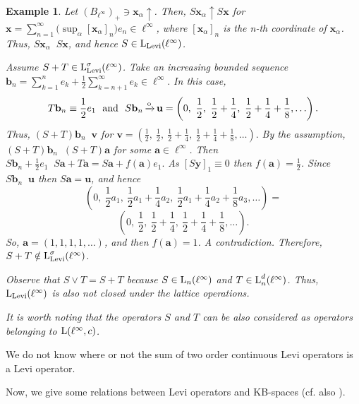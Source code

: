 \documentclass[10pt]{article}
\makeatletter
\newtheorem{example}[theorem]{Example}
\DeclareMathOperator{\convo}{\xrightarrow[]{o}}
\renewcommand{\subsection}{\@startsection{subsection}{1}
{0pt}{3.25ex plus 1ex minus.2ex}{-1em}{\normalfont\normalsize\bf}}
\makeatother
\begin{document}
{{{\begin{example}
{Let $(B_{\ell^\infty})_+\ni\mathbf{x}_\alpha\uparrow$.
Then, $S\mathbf{x}_\alpha\uparrow S\mathbf{x}$ for
$\mathbf{x}=\sum_{n=1}^\infty\Big(\sup_\alpha[\mathbf{x}_\alpha]_n\Big)e_n\in\ell^\infty$, 
where $[\mathbf{x}_\alpha]_n$ is the n-th coordinate of $\mathbf{x}_\alpha$.
Thus, $S\mathbf{x}_\alpha\convo S\mathbf{x}$, and hence
$S\in\text{\rm L}_{\text{\rm Levi}}(\ell^\infty)$.

Assume $S+T\in\text{\rm L}^\sigma_{\text{\rm Levi}}(\ell^\infty)$.
Take an increasing bounded sequence 
$
   \mathbf{b}_n=\sum_{k=1}^n e_k+\frac{1}{2}\sum_{k=n+1}^\infty e_k\in\ell^\infty.
$
In this case, 
$$
   T\mathbf{b}_n\equiv\frac{1}{2}e_1 \ \ \text{\rm and} \ \ 
   S\mathbf{b}_n\convo\mathbf{u}=\left(0, \ \frac{1}{2}, \ \frac{1}{2}+\frac{1}{4}, \   \frac{1}{2}+\frac{1}{4}+\frac{1}{8}, \ldots \right).
$$
Thus, $(S+T)\mathbf{b}_n\convo\mathbf{v}$ for
$
   \mathbf{v}=\left(\frac{1}{2}, \ \frac{1}{2}, \ \frac{1}{2}+\frac{1}{4}, \ 
   \frac{1}{2}+\frac{1}{4}+\frac{1}{8}, \ldots \right).
$
By the assumption, $(S+T)\mathbf{b}_n\convo(S+T)\mathbf{a}$
for some $\mathbf{a}\in\ell^\infty$. Then 
$
   S\mathbf{b}_n+\frac{1}{2}e_1\convo S\mathbf{a}+T\mathbf{a}= 
   S\mathbf{a}+f(\mathbf{a})e_1.
$
As $[S\mathbf{y}]_1\equiv 0$ then
$f(\mathbf{a})=\frac{1}{2}$.
Since $S\mathbf{b}_n\convo\mathbf{u}$ 
then $S\mathbf{a}=\mathbf{u}$, 
and hence 
$$
   \left(0,\ \frac{1}{2}a_1, \ \frac{1}{2}a_1+\frac{1}{4}a_2, \
   \frac{1}{2}a_1+\frac{1}{4}a_2+\frac{1}{8}a_3, \ldots\right)=
$$
$$
   \left(0, \ \frac{1}{2}, \ \frac{1}{2}+\frac{1}{4}, \ 
   \frac{1}{2}+\frac{1}{4}+\frac{1}{8}, \ldots \right).
$$
So, $\mathbf{a}=\left(1,1, 1, 1, \ldots\right)$,
and then $f(\mathbf{a})=1$. A contradiction. Therefore,  
$S+T\notin\text{\rm L}^\sigma_{\text{\rm Levi}}(\ell^\infty)$.

Observe that $S\vee T=S+T$ because $S\in\text{\rm L}_n(\ell^\infty)$ and 
$T\in\text{\rm L}_n^d(\ell^\infty)$. Thus, $\text{\rm L}_{\text{\rm Levi}}(\ell^\infty)$ 
is also not closed under the lattice operations.

It is worth noting that the operators $S$ and $T$ can be also considered as 
operators belonging to $\text{\rm L}(\ell^\infty,c)$.}
\end{example}

\medskip
We do not know where or not the sum of two order continuous Levi operators 
is a Levi operator.

\medskip
Now, we give some relations between Levi operators and KB-spaces (cf. also \cite[Theorem 2,  Corollary 1]{E2025-1}). 

}}}
\end{document}
